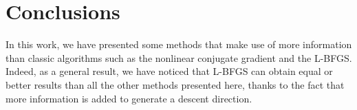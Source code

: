 \documentclass[11pt]{article}
\begin{document}
\section{Conclusions}
\label{sec:conclusions}
In this work, we have presented some methods that make use of more information than classic algorithms such as the nonlinear conjugate gradient and the L-BFGS. Indeed, as a general result, we have noticed that L-BFGS can obtain equal or better results than all the other methods presented here, thanks to the fact that more information is added to generate a descent direction. 
 

%
\end{document}
